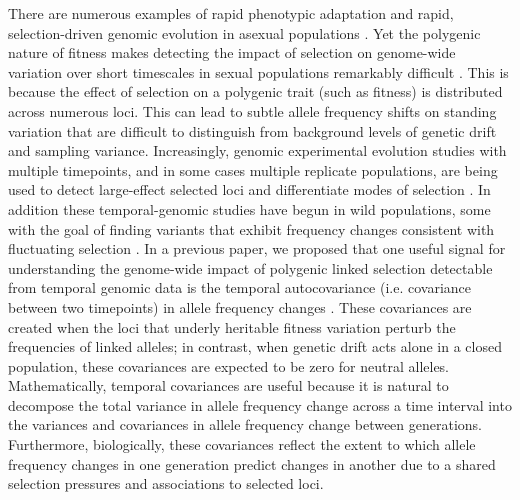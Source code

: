 \documentclass[9pt,twocolumn,twoside]{pnas-new}
\begin{document}
There are numerous examples of rapid phenotypic adaptation
\cite{Grant2011-wk,Grant2006-hj,Reznick1997-mh,Franks2007-dr} and rapid,
selection-driven genomic evolution in asexual populations
\cite{Good2017-om,Bennett1990-bc,Baym2016-kh}.  Yet the polygenic nature
of fitness makes detecting the impact of selection on genome-wide variation
over short timescales in sexual populations remarkably difficult
\cite{Latta1998-me, Pritchard2010-tk,Kemper2014-bx}. This is because the
effect of selection on a polygenic trait (such as fitness) is distributed
across numerous loci. This can lead to subtle allele frequency shifts on
standing variation that are difficult to distinguish from background levels of
genetic drift and sampling variance. Increasingly, genomic experimental
evolution studies with multiple timepoints, and in some cases multiple
replicate populations, are being used to detect large-effect selected loci
\cite{Turner2011-sx,Turner2012-bm} and differentiate modes of selection
\cite{Burke2010-tz,Barghi2019-qy,Therkildsen2019-zy}.  In addition these
temporal-genomic studies have begun in wild populations, some with the goal of
finding variants that exhibit frequency changes consistent with fluctuating
selection \cite{Bergland2014-ij,Machado2018-cs}. In a previous paper, we
proposed that one useful signal for understanding the genome-wide impact of
polygenic linked selection detectable from temporal genomic data is the
temporal autocovariance (i.e. covariance between two timepoints) in allele
frequency changes \cite{Buffalo2019-io}.  These covariances are created
when the loci that underly heritable fitness variation perturb the frequencies
of linked alleles; in contrast, when genetic drift acts alone in a closed
population, these covariances are expected to be zero for neutral alleles.
Mathematically, temporal covariances are useful because it is natural to
decompose the total variance in allele frequency change across a time interval
into the variances and covariances in allele frequency change between
generations.  Furthermore, biologically, these covariances reflect the extent
to which allele frequency changes in one generation predict changes in another
due to a shared selection pressures and associations to selected loci.
\end{document}
